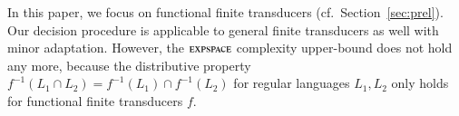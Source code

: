 \begin{remark}
	In this paper, we focus on functional finite transducers (cf.\ Section~\ref{sec:prel}). Our decision procedure is applicable to general finite transducers as well with minor adaptation. However, the $\textsc{expspace}$ complexity upper-bound does not hold any more, because the distributive property $f^{-1}(L_1\cap L_2)= f^{-1}(L_1)\cap f^{-1}(L_2)$ for regular languages $L_1, L_2$ only holds for functional finite transducers $f$.  
\end{remark}


